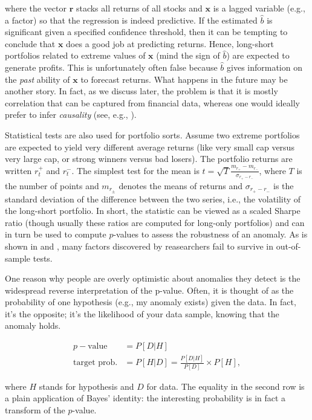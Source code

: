 where the vector $\textbf{r}$ stacks all returns of all stocks and $\textbf{x}$ is a lagged variable (e.g., a factor) so that the regression is indeed predictive. If the estimated $\hat{b}$ is significant given a specified confidence threshold, then it can be tempting to conclude that $\textbf{x}$ does a good job at predicting returns. Hence, long-short portfolios related to extreme values of $\textbf{x}$ (mind the sign of $\hat{b}$) are expected to generate profits. This is unfortunately often false because $\hat{b}$ gives information on the \textit{past} ability of $\textbf{x}$ to forecast returns. What happens in the future may be another story. In fact, as we discuss later, the problem is that it is mostly correlation that can be captured from financial data, whereas one would ideally prefer to infer \textit{causality} (see, e.g., \cite{de2026correcting}).

Statistical tests are also used for portfolio sorts. Assume two extreme portfolios are expected to yield very different average returns (like very small cap versus very large cap, or strong winners versus bad losers). The portfolio returns are written $r_t^+$ and $r_t^ -$. The simplest test for the mean is $t=\sqrt{T}\frac{m_{r_+} -m_{r_ -}}{\sigma_{r_+ -r_ -}}$, where $T$ is the number of points and $m_{r_\pm}$ denotes the means of returns and $\sigma_{r_+ -r_ -}$ is the standard deviation of the difference between the two series, i.e., the volatility of the long-short portfolio. In short, the statistic can be viewed as a scaled Sharpe ratio (though usually these ratios are computed for long-only portfolios) and can in turn be used to compute $p$-values to assess the robustness of an anomaly. As is shown in \cite{linnainmaa2018history} and \cite{hou2019replicating}, many factors discovered by reasearchers fail to survive in out-of-sample tests.

One reason why people are overly optimistic about anomalies they detect is the widespread reverse interpretation of the p-value. Often, it is thought of as the probability of one hypothesis (e.g., my anomaly exists) given the data. In fact, it's the opposite; it's the likelihood of your data sample, knowing that the anomaly holds.

\begin{align*}
p-\text{value} &= P[D|H] \\
\text{target prob.}& = P[H|D]=\frac{P[D|H]}{P[D]}\times P[H],
\end{align*}

where $H$ stands for hypothesis and $D$ for data. The equality in the second row is a plain application of Bayes' identity: the interesting probability is in fact a transform of the $p$-value.

